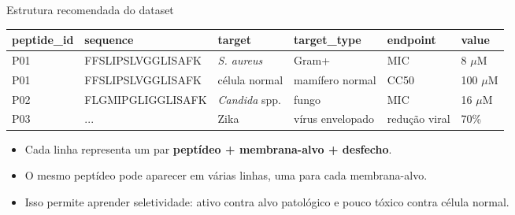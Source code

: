 \documentclass[aspectratio=169,10pt]{beamer}
\begin{document}
\begin{frame}{Estrutura recomendada do dataset}
\scriptsize
\begin{center}
\setlength{\tabcolsep}{3pt}
\begin{tabular}{p{1.35cm}p{3.5cm}p{2.6cm}p{2.8cm}p{1.9cm}p{1.5cm}}
\toprule
\textbf{peptide\_id} & \textbf{sequence} & \textbf{target} & \textbf{target\_type} & \textbf{endpoint} & \textbf{value} \\
\midrule
P01 & \ttfamily FFSLIPSLVGGLISAFK & \textit{S. aureus} & Gram+ & MIC & 8 $\mu$M \\
P01 & \ttfamily FFSLIPSLVGGLISAFK & célula normal & mamífero normal & CC50 & 100 $\mu$M \\
P02 & \ttfamily FLGMIPGLIGGLISAFK & \textit{Candida} spp. & fungo & MIC & 16 $\mu$M \\
P03 & \ttfamily ... & Zika & vírus envelopado & redução viral & 70\% \\
\bottomrule
\end{tabular}
\end{center}

\vspace{0.10cm}
\begin{itemize}
  \item Cada linha representa um par \textbf{peptídeo + membrana-alvo + desfecho}.
  \item O mesmo peptídeo pode aparecer em várias linhas, uma para cada membrana-alvo.
  \item Isso permite aprender \alert{seletividade}: ativo contra alvo patológico e pouco tóxico contra célula normal.
\end{itemize}
\end{frame}
\end{document}

